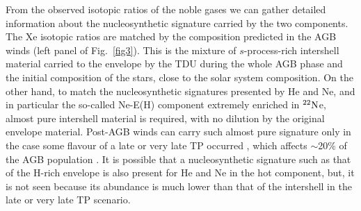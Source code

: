 \documentclass{iau}
\newcommand{\iso}[2]{\hbox{${}^{#1}{\rm #2}$}}
\begin{document}

From the observed isotopic ratios of the noble gases we can gather detailed information 
about the nucleosynthetic signature carried by the two components. The Xe isotopic 
ratios are matched by the composition predicted in the AGB winds (left panel of 
Fig.~\ref{fig3}). 
This is the mixture of $s$-process-rich intershell material carried to the envelope by the 
TDU during the whole AGB phase and the initial composition of the stars, close to the 
solar system composition. On the other hand, to match the nucleosynthetic signatures 
presented by He and Ne, and in particular the so-called Ne-E(H) component extremely 
enriched in \iso{22}Ne, almost pure intershell material is required, with no dilution by the
original envelope material. Post-AGB winds can carry such almost pure 
signature only in the case some flavour of a late or very late TP occurred 
\citep{bloecker01}, which affects $\sim$20\% of the AGB population \citep[e.g.,][]{werner06}. 
It is 
possible that a nucleosynthetic signature such as that of the H-rich envelope 
is also present for He and Ne in the hot component, but, it is not seen because its 
abundance is much lower than that of the intershell in the late or very late TP scenario.
\end{document}
